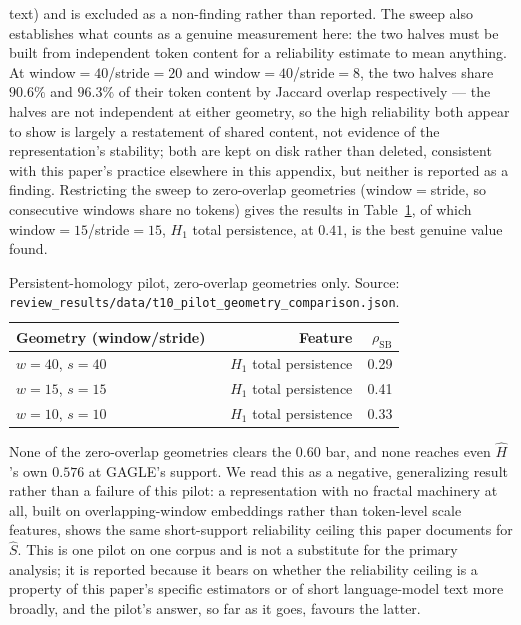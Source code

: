 \documentclass{article}
\newcommand{\Sest}{\ensuremath{\widehat{S}}}
\newcommand{\Hest}{\ensuremath{\widehat{H}}}
\begin{document}
text) and is excluded as a non-finding rather than reported. The sweep also
establishes what counts as a genuine measurement here: the two halves must be
built from independent token content for a reliability estimate to mean
anything. At window$=40$/stride$=20$ and window$=40$/stride$=8$, the two
halves share $90.6\%$ and $96.3\%$ of their token content by Jaccard overlap
respectively --- the halves are not independent at either geometry, so the
high reliability both appear to show is largely a restatement of shared
content, not evidence of the representation's stability; both are kept on
disk rather than deleted, consistent with this paper's practice elsewhere in
this appendix, but neither is reported as a finding. Restricting the sweep to
zero-overlap geometries (window$=$stride, so consecutive windows share no
tokens) gives the results in Table~\ref{tab:t10geometry}, of which
window$=15$/stride$=15$, $H_1$ total persistence, at $0.41$, is the best
genuine value found.

\begin{table}[h]
\centering
\footnotesize
\caption{Persistent-homology pilot, zero-overlap geometries only.
Source: \texttt{review\_results/data/t10\_pilot\_geometry\_comparison.json}.}
\label{tab:t10geometry}
\begin{tabular}{lrr}
\toprule
Geometry (window/stride) & Feature & $\rho_{\mathrm{SB}}$ \\
\midrule
$w{=}40$, $s{=}40$ & $H_1$ total persistence & 0.29 \\
$w{=}15$, $s{=}15$ & $H_1$ total persistence & 0.41 \\
$w{=}10$, $s{=}10$ & $H_1$ total persistence & 0.33 \\
\bottomrule
\end{tabular}
\end{table}

None of the zero-overlap geometries clears the $0.60$ bar, and none reaches even
\Hest's own $0.576$ at GAGLE's support. We read this as a negative, generalizing result rather
than a failure of this pilot: a representation with no fractal machinery at all,
built on overlapping-window embeddings rather than token-level scale features,
shows the same short-support reliability ceiling this paper documents for \Sest.
This is one pilot on one corpus and is not a substitute for the primary analysis;
it is reported because it bears on whether the reliability ceiling is a property
of this paper's specific estimators or of short language-model text more broadly,
and the pilot's answer, so far as it goes, favours the latter.
\end{document}
